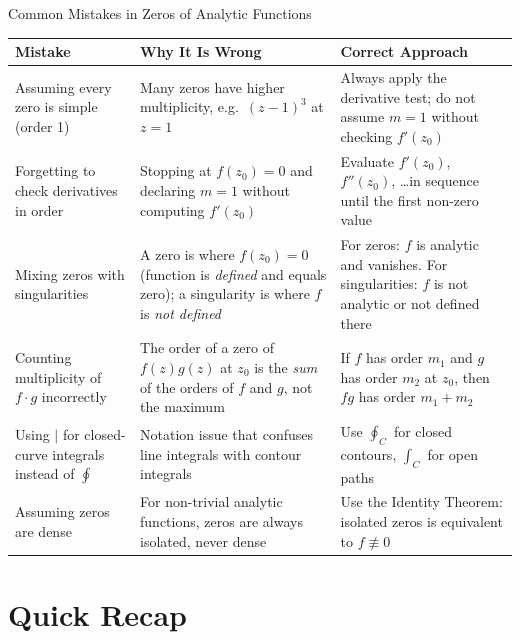 \documentclass[12pt,a4paper]{article}
\begin{document}
\begin{mistakebox}{Common Mistakes in Zeros of Analytic Functions}
\begin{center}
\begin{tabular}{>{\raggedright}p{5.5cm} >{\raggedright}p{4.5cm} >{\raggedright\arraybackslash}p{4.0cm}}
\toprule
\textbf{Mistake} & \textbf{Why It Is Wrong} & \textbf{Correct Approach}\\
\midrule
Assuming every zero is simple (order 1) &
Many zeros have higher multiplicity, e.g.\ $(z-1)^3$ at $z=1$ &
Always apply the derivative test; do not assume $m=1$ without checking $f'(z_0)$\\[6pt]
Forgetting to check derivatives in order &
Stopping at $f(z_0)=0$ and declaring $m=1$ without computing $f'(z_0)$ &
Evaluate $f'(z_0)$, $f''(z_0)$, \ldots in sequence until the first non-zero value\\[6pt]
Mixing zeros with singularities &
A zero is where $f(z_0)=0$ (function is \emph{defined} and equals zero); a singularity is
where $f$ is \emph{not defined} &
For zeros: $f$ is analytic and vanishes. For singularities: $f$ is not analytic or not defined there\\[6pt]
Counting multiplicity of $f\cdot g$ incorrectly &
The order of a zero of $f(z)g(z)$ at $z_0$ is the \emph{sum} of the orders of $f$ and $g$,
not the maximum &
If $f$ has order $m_1$ and $g$ has order $m_2$ at $z_0$, then $fg$ has order $m_1+m_2$\\[6pt]
Using $|$ for closed-curve integrals instead of $\oint$ &
Notation issue that confuses line integrals with contour integrals &
Use $\oint_C$ for closed contours, $\int_C$ for open paths\\[6pt]
Assuming zeros are dense &
For non-trivial analytic functions, zeros are always isolated, never dense &
Use the Identity Theorem: isolated zeros is equivalent to $f\not\equiv 0$\\
\bottomrule
\end{tabular}
\end{center}
\end{mistakebox}

\section{Quick Recap}
\end{document}
